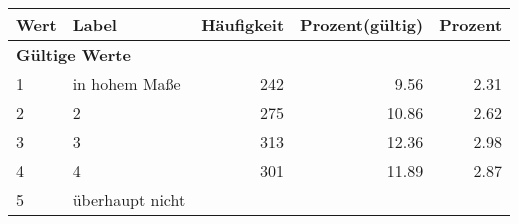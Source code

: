      \begin{longtable}{lXrrr}
     \toprule
     \textbf{Wert} & \textbf{Label} & \textbf{Häufigkeit} & \textbf{Prozent(gültig)} & \textbf{Prozent} \\
     \endhead
     \midrule
     \multicolumn{5}{l}{\textbf{Gültige Werte}}\\

     1 &
     \multicolumn{1}{X}{ in hohem Maße   } &


       \num{242} &
       \num[round-mode=places,round-precision=2]{9,56} &
         \num[round-mode=places,round-precision=2]{2,31} \\

     2 &
     \multicolumn{1}{X}{ 2   } &


       \num{275} &
       \num[round-mode=places,round-precision=2]{10,86} &
         \num[round-mode=places,round-precision=2]{2,62} \\

     3 &
     \multicolumn{1}{X}{ 3   } &


       \num{313} &
       \num[round-mode=places,round-precision=2]{12,36} &
         \num[round-mode=places,round-precision=2]{2,98} \\

     4 &
     \multicolumn{1}{X}{ 4   } &


       \num{301} &
       \num[round-mode=places,round-precision=2]{11,89} &
         \num[round-mode=places,round-precision=2]{2,87} \\

     5 &
     \multicolumn{1}{X}{ überhaupt nicht   } &



\end{longtable}
